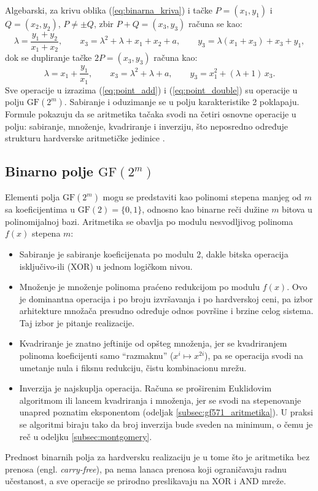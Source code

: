 Algebarski, za krivu oblika (\ref{eq:binarna_kriva}) i tačke $P=(x_1, y_1)$ i $Q=(x_2, y_2)$, $P \neq \pm Q$, zbir $P+Q=(x_3, y_3)$ računa se kao:
\begin{equation}
    \lambda = \frac{y_1 + y_2}{x_1 + x_2}, \qquad
    x_3 = \lambda^2 + \lambda + x_1 + x_2 + a, \qquad
    y_3 = \lambda(x_1 + x_3) + x_3 + y_1,
    \label{eq:point_add}
\end{equation}
dok se dupliranje tačke $2P=(x_3,y_3)$ računa kao:
\begin{equation}
    \lambda = x_1 + \frac{y_1}{x_1}, \qquad
    x_3 = \lambda^2 + \lambda + a, \qquad
    y_3 = x_1^2 + (\lambda + 1)\,x_3.
    \label{eq:point_double}
\end{equation}
Sve operacije u izrazima (\ref{eq:point_add}) i (\ref{eq:point_double}) su operacije u polju $\mathrm{GF}(2^m)$. Sabiranje i oduzimanje se u polju karakteristike 2 poklapaju. Formule pokazuju da se aritmetika tačaka svodi na četiri osnovne operacije u polju: sabiranje, množenje, kvadriranje i inverziju, što neposredno određuje strukturu hardverske aritmetičke jedinice \cite{hankerson}.

\subsection{Binarno polje \texorpdfstring{$\mathrm{GF}(2^m)$}{GF(2\^{}m)}}
\label{subsec:binarno_polje}

Elementi polja $\mathrm{GF}(2^m)$ mogu se predstaviti kao polinomi stepena manjeg od $m$ sa koeficijentima u $\mathrm{GF}(2)=\{0,1\}$, odnosno kao binarne reči dužine $m$ bitova u polinomijalnoj bazi. Aritmetika se obavlja po modulu nesvodljivog polinoma $f(x)$ stepena $m$:
\begin{itemize}[itemsep=2pt]
    \item Sabiranje je sabiranje koeficijenata po modulu 2, dakle bitska operacija isključivo-ili (XOR) u jednom logičkom nivou.
    \item Množenje je množenje polinoma praćeno redukcijom po modulu $f(x)$. Ovo je dominantna operacija i po broju izvršavanja i po hardverskoj ceni, pa izbor arhitekture množača presudno određuje odnos površine i brzine celog sistema. Taj izbor je pitanje realizacije.
    \item Kvadriranje je znatno jeftinije od opšteg množenja, jer se kvadriranjem polinoma koeficijenti samo ``razmaknu'' ($x^i \mapsto x^{2i}$), pa se operacija svodi na umetanje nula i fiksnu redukciju, čistu kombinacionu mrežu.
    \item Inverzija je najskuplja operacija. Računa se proširenim Euklidovim algoritmom ili lancem kvadriranja i množenja, jer se svodi na stepenovanje unapred poznatim eksponentom (odeljak \ref{subsec:gf571_aritmetika}). U praksi se algoritmi biraju tako da broj inverzija bude sveden na minimum, o čemu je reč u odeljku \ref{subsec:montgomery}.
\end{itemize}
\smallbreak
Prednost binarnih polja za hardversku realizaciju je u tome što je aritmetika bez prenosa (engl. \textit{carry-free}), pa nema lanaca prenosa koji ograničavaju radnu učestanost, a sve operacije se prirodno preslikavaju na XOR i AND mreže.

